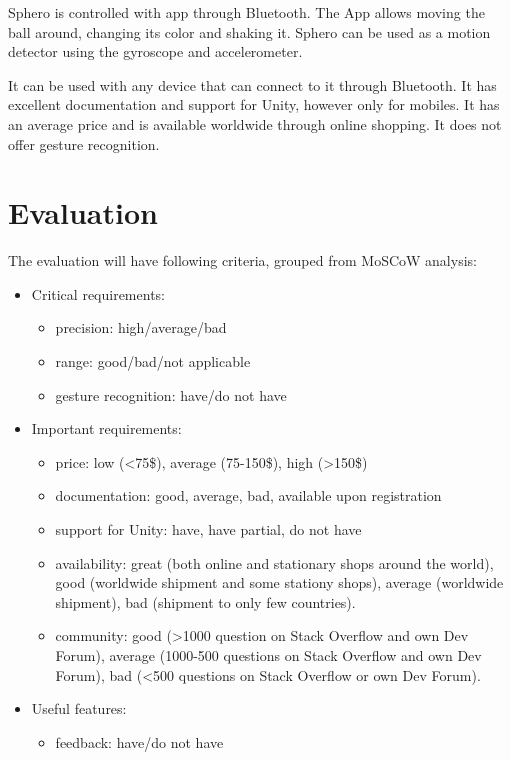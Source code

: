 Sphero is controlled with app through Bluetooth. The App allows moving the ball around, changing its color and shaking it. Sphero can be used as a motion detector using the gyroscope and accelerometer.

It can be used with any device that can connect to it through Bluetooth. It has excellent documentation and support for Unity, however only for mobiles. It has an average price and is available worldwide through online shopping. It does not offer gesture recognition.

\section{Evaluation}

The evaluation will have following criteria, grouped from MoSCoW analysis:
\begin{itemize}
\item Critical requirements:
\begin{itemize}
	\item precision: high/average/bad
	\item range: good/bad/not applicable
	\item gesture recognition: have/do not have
\end{itemize}
\item Important requirements:
\begin{itemize}
	\item price: low (<75\$), average (75-150\$), high (>150\$) 
	\item documentation: good, average, bad, available upon registration
	\item support for Unity: have, have partial, do not have
	\item availability: great (both online and stationary shops around the world), good (worldwide shipment and some stationy shops), average (worldwide shipment), bad (shipment to only few countries).
	\item community: good (>1000 question on Stack Overflow and own Dev Forum), average (1000-500 questions on Stack Overflow and own Dev Forum), bad (<500 questions on Stack Overflow or own Dev Forum).
\end{itemize}
\item Useful features:
\begin{itemize}
	\item feedback: have/do not have
\end{itemize}
\end{itemize}

